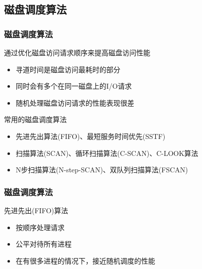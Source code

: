\subsection{磁盘调度算法} %
\begin{frame}[fragile]
    \frametitle{磁盘调度算法}
   通过优化磁盘访问请求顺序来提高磁盘访问性能
    \begin{itemize}
        \item 寻道时间是磁盘访问最耗时的部分
        \item 同时会有多个在同一磁盘上的I/O请求
        \item 随机处理磁盘访问请求的性能表现很差

    \end{itemize} \pause
    常用的磁盘调度算法
    \begin{itemize}
        \item 先进先出算法(FIFO)、最短服务时间优先(SSTF)
        \item 扫描算法(SCAN)、循环扫描算法(C-SCAN)、C-LOOK算法
        \item N步扫描算法(N-step-SCAN)、双队列扫描算法(FSCAN)

    \end{itemize}

\end{frame}

\begin{frame}[fragile]
    \frametitle{磁盘调度算法}
    先进先出(FIFO)算法
    \begin{itemize}
        \item 按顺序处理请求
        \item 公平对待所有进程
        \item 在有很多进程的情况下，接近随机调度的性能
    \end{itemize}
\end{frame}

